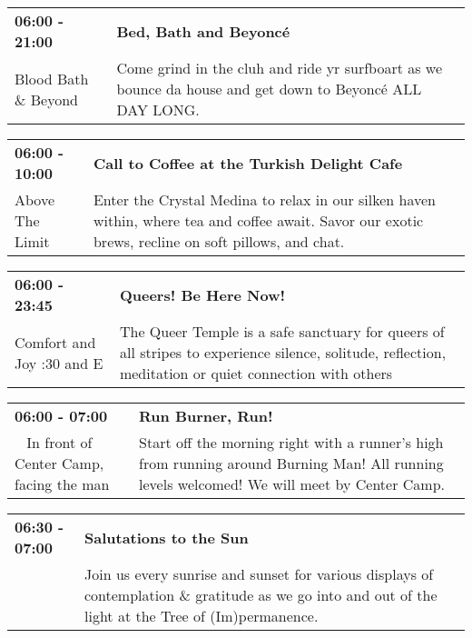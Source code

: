 \begin{tabular}{ p{1in} p{2.2in} }
    \textbf{06:00 - 21:00} & \textbf{Bed, Bath and Beyonc\'e} \\
    Blood Bath \& Beyond \newline  & Come grind in the cluh and ride yr surfboart as we bounce da house and get down to Beyonc\'e ALL DAY LONG. \\
    \hline 
\end{tabular}
    
\begin{tabular}{ p{1in} p{2.2in} }
    \textbf{06:00 - 10:00} & \textbf{Call to Coffee at the Turkish Delight Cafe} \\
    Above The Limit \newline  & Enter the Crystal Medina to relax in our silken haven within, where tea and coffee await. Savor our exotic brews, recline on soft pillows, and chat. \\
    \hline 
\end{tabular}
    
\begin{tabular}{ p{1in} p{2.2in} }
    \textbf{06:00 - 23:45} & \textbf{Queers! Be Here Now!} \\
    Comfort and Joy \newline 7:30 and E & The Queer Temple is a safe sanctuary for queers of all stripes to experience silence, solitude, reflection, meditation or quiet connection with others \\
    \hline 
\end{tabular}
    
\begin{tabular}{ p{1in} p{2.2in} }
    \textbf{06:00 - 07:00} & \textbf{Run Burner, Run!} \\
    ~ \newline In front of Center Camp, facing the man & Start off the morning right with a runner's high from running around Burning Man! All running levels welcomed! We will meet by Center Camp. \\
    \hline 
\end{tabular}
    
\begin{tabular}{ p{1in} p{2.2in} }
    \textbf{06:30 - 07:00} & \textbf{Salutations to the Sun} \\
    ~ \newline  & Join us every sunrise and sunset for various displays of contemplation \& gratitude as we go into and out of the light at the Tree of (Im)permanence. \\
    \hline 
\end{tabular}
    
